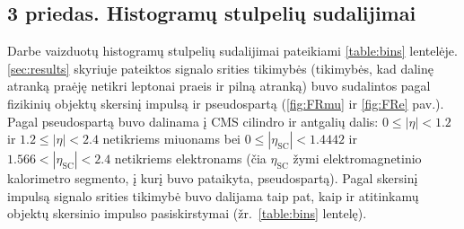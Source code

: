 \documentclass[a4paper, 12pt, oneside]{article}
\newlength\q
\begin{document}
\vspace{2cm}
\subsection*{3 priedas. Histogramų stulpelių sudalijimai}
Darbe vaizduotų histogramų stulpelių sudalijimai pateikiami \ref{table:bins} lentelėje.
\ref{sec:results} skyriuje pateiktos signalo srities tikimybės (tikimybės, kad dalinę atranką praėję netikri leptonai praeis ir pilną atranką) 
buvo sudalintos pagal fizikinių objektų skersinį impulsą ir pseudospartą (\ref{fig:FRmu} ir \ref{fig:FRe} pav.).
Pagal pseudospartą buvo dalinama į CMS cilindro ir antgalių dalis: $0\!\leqslant\!|\eta|\!<\!1.2$ ir $1.2\!\leqslant\!|\eta|\!<\!2.4$
netikriems miuonams bei $0\!\leqslant\!|\eta_{\mathrm{SC}}|\!<\!1.4442$ ir $1.566\!<\!|\eta_{\mathrm{SC}}|\!<\!2.4$ netikriems elektronams
(čia $\eta_{\mathrm{SC}}$ žymi elektromagnetinio kalorimetro segmento, į kurį buvo pataikyta, pseudospartą).
Pagal skersinį impulsą signalo srities tikimybė buvo dalijama taip pat, kaip ir atitinkamų objektų skersinio impulso pasiskirstymai
(žr.\ \ref{table:bins} lentelę).
\end{document}
